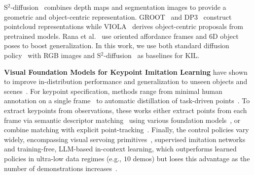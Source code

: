 \documentclass[letterpaper, 10 pt, conference]{ieeeconf}  %
\begin{document}
S$^2$-diffusion~\cite{yang2025S2} combines depth maps and segmentation images to provide a geometric and object-centric representation. GROOT~\cite{zhu2023learning} and DP3~\cite{ze20243d} construct pointcloud representations while VIOLA~\cite{zhu2023viola} derives object-centric proposals from pretrained models.
Rana et al.~\cite{rana2024learning} use oriented affordance frames and 6D object poses to boost generalization.
In this work, we use both standard diffusion policy~\cite{chi2025diffusion_policy} with RGB images and S$^2$-diffusion~\cite{yang2025S2} as baselines for KIL.



\textbf{Visual Foundation Models for Keypoint Imitation Learning} have shown to improve in-distribution performance and generalization to unseen objects and scenes~\cite{Levy2025P3PO,di2024KAT,wang2025skil}. For keypoint specification, methods range from minimal human annotation on a single frame~\cite{haldar2025pointpolicy,Levy2025P3PO} to automatic distillation of task-driven points~\cite{vecerik2024robotap,zhang2025atk,wang2025skil,di2024KAT}. To extract keypoints from observations, these works either extract points from each frame via semantic descriptor matching~\cite{wang2025skil,di2024KAT} using various foundation models~\cite{tang2023dift,simeoni2025dinov3,heinrich2025radiov2.5}, or combine matching with explicit point-tracking~\cite{vecerik2024robotap,haldar2025pointpolicy,Levy2025P3PO,zhang2025atk}. 
Finally, the control policies vary widely, encompassing visual servoing primitives~\cite{vecerik2024robotap}, supervised imitation networks~\cite{zhang2025atk,wang2025skil,Levy2025P3PO,haldar2025pointpolicy} and training-free, LLM-based in-context learning, which outperforms learned policies in ultra-low data regimes (e.g., $10$ demos) but loses this advantage as the number of demonstrations increases~\cite{di2024KAT}. 
\end{document}
